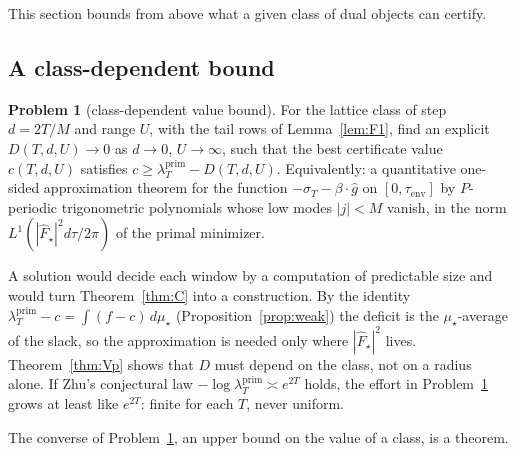 \documentclass[11pt]{amsart}
\theoremstyle{definition}
\newtheorem{problem}[theorem]{Problem}
\theoremstyle{remark}
\newcommand{\lamP}{\lambda^{\mathrm{prim}}_T}
\newcommand{\sT}{\sigma_T}
\newcommand{\Fh}{\widehat F}
\begin{document}
This section bounds from above what a given class of dual objects can certify.

\subsection{A class-dependent bound}
\begin{problem}[class-dependent value bound]\label{prob:A}
For the lattice class of step $d=2T/M$ and range $U$, with the tail rows of Lemma~\ref{lem:F1},
find an explicit $D(T,d,U)\to0$ as $d\to0$, $U\to\infty$, such that the best certificate value
$c(T,d,U)$ satisfies $c\ge\lamP-D(T,d,U)$. Equivalently: a quantitative one-sided approximation
theorem for the function $-\sT-\beta\cdot\widehat g$ on $[0,\tau_{\mathrm{env}}]$ by $P$-periodic
trigonometric polynomials whose low modes $|j|<M$ vanish, in the norm $L^1(|\Fh_\star|^2d\tau/2\pi)$
of the primal minimizer.
\end{problem}
A solution would decide each window by a computation of predictable size and would turn
Theorem~\ref{thm:C} into a construction. By the identity $\lamP-c=\int(f-c)\,d\mu_\star$
(Proposition~\ref{prop:weak}) the deficit is the $\mu_\star$-average of the slack, so the
approximation is needed only where $|\Fh_\star|^2$ lives. Theorem~\ref{thm:Vp} shows that $D$ must
depend on the class, not on a radius alone. If Zhu's conjectural law $-\log\lamP\asymp e^{2T}$ holds,
the effort in Problem~\ref{prob:A} grows at least like $e^{2T}$: finite for each $T$, never uniform.

The converse of Problem~\ref{prob:A}, an upper bound on the value of a class, is a theorem.
\end{document}
